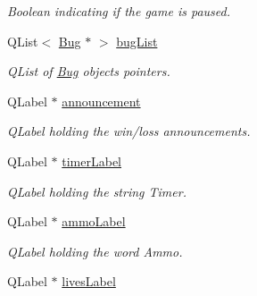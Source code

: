 \begin{DoxyCompactItemize}
\begin{DoxyCompactList}\small\item\em Boolean indicating if the game is paused. \end{DoxyCompactList}\item 
\hypertarget{classGame2Scene_ac07f98d0be2ccfc03a6619ac0a8b124b}{Q\-List$<$ \hyperlink{classBug}{Bug} $\ast$ $>$ \hyperlink{classGame2Scene_ac07f98d0be2ccfc03a6619ac0a8b124b}{bug\-List}}\label{classGame2Scene_ac07f98d0be2ccfc03a6619ac0a8b124b}

\begin{DoxyCompactList}\small\item\em Q\-List of \hyperlink{classBug}{Bug} objects pointers. \end{DoxyCompactList}\item 
\hypertarget{classGame2Scene_a223238283a2e526ac893d96d40a676e9}{Q\-Label $\ast$ \hyperlink{classGame2Scene_a223238283a2e526ac893d96d40a676e9}{announcement}}\label{classGame2Scene_a223238283a2e526ac893d96d40a676e9}

\begin{DoxyCompactList}\small\item\em Q\-Label holding the win/loss announcements. \end{DoxyCompactList}\item 
\hypertarget{classGame2Scene_a345a19734cbec994392934782c7f570a}{Q\-Label $\ast$ \hyperlink{classGame2Scene_a345a19734cbec994392934782c7f570a}{timer\-Label}}\label{classGame2Scene_a345a19734cbec994392934782c7f570a}

\begin{DoxyCompactList}\small\item\em Q\-Label holding the string Timer. \end{DoxyCompactList}\item 
\hypertarget{classGame2Scene_ad6e653249d8185beff9c3ec0a065b22e}{Q\-Label $\ast$ \hyperlink{classGame2Scene_ad6e653249d8185beff9c3ec0a065b22e}{ammo\-Label}}\label{classGame2Scene_ad6e653249d8185beff9c3ec0a065b22e}

\begin{DoxyCompactList}\small\item\em Q\-Label holding the word Ammo. \end{DoxyCompactList}\item 
\hypertarget{classGame2Scene_ae17ea5202378d167508314349e97471d}{Q\-Label $\ast$ \hyperlink{classGame2Scene_ae17ea5202378d167508314349e97471d}{lives\-Label}}\label{classGame2Scene_ae17ea5202378d167508314349e97471d}


\end{DoxyCompactItemize}
